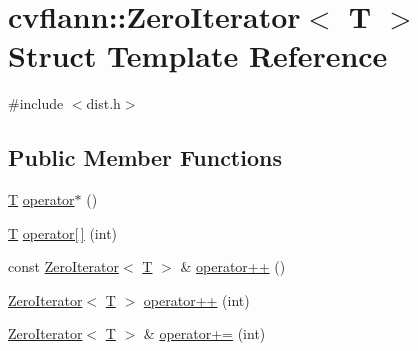\hypertarget{structcvflann_1_1ZeroIterator}{\section{cvflann\-:\-:Zero\-Iterator$<$ T $>$ Struct Template Reference}
\label{structcvflann_1_1ZeroIterator}
}


{\ttfamily \#include $<$dist.\-h$>$}

\subsection*{Public Member Functions}
\begin{DoxyCompactItemize}
\item 
\hyperlink{calib3d_8hpp_a3efb9551a871ddd0463079a808916717}{T} \hyperlink{structcvflann_1_1ZeroIterator_a7113f1adf6886a4633edc804070a35f2}{operator$\ast$} ()
\item 
\hyperlink{calib3d_8hpp_a3efb9551a871ddd0463079a808916717}{T} \hyperlink{structcvflann_1_1ZeroIterator_aea021b9f2244dda72201d27ea91636bd}{operator\mbox{[}$\,$\mbox{]}} (int)
\item 
const \hyperlink{structcvflann_1_1ZeroIterator}{Zero\-Iterator}$<$ \hyperlink{calib3d_8hpp_a3efb9551a871ddd0463079a808916717}{T} $>$ \& \hyperlink{structcvflann_1_1ZeroIterator_a91e8578dedf4fc81033112e1a466af1a}{operator++} ()
\item 
\hyperlink{structcvflann_1_1ZeroIterator}{Zero\-Iterator}$<$ \hyperlink{calib3d_8hpp_a3efb9551a871ddd0463079a808916717}{T} $>$ \hyperlink{structcvflann_1_1ZeroIterator_a7c647a9b155b2a08c9708af0f2a560b6}{operator++} (int)
\item 
\hyperlink{structcvflann_1_1ZeroIterator}{Zero\-Iterator}$<$ \hyperlink{calib3d_8hpp_a3efb9551a871ddd0463079a808916717}{T} $>$ \& \hyperlink{structcvflann_1_1ZeroIterator_a2316ee66a8114d553931ea6cba0f0da9}{operator+=} (int)
\end{DoxyCompactItemize}


